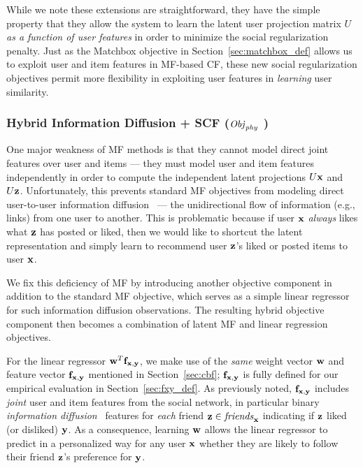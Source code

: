 While we note these extensions are straightforward, they have the
simple property that they allow the system to learn the latent user
projection matrix $U$ \emph{as a function of user features} in order
to minimize the social regularization penalty.  Just as the Matchbox
objective in Section~\ref{sec:matchbox_def} allows us to exploit user
and item features in MF-based CF, these new social regularization
objectives permit more flexibility in exploiting user features in
\emph{learning} user similarity.


\subsubsection{Hybrid Information Diffusion + SCF ($\mathit{Obj}_{\mathit{phy}}$ )}

\label{sec:hybrid_scf}

One major weakness of MF methods is that they cannot model direct
joint features over user and items --- they must model user and item
features independently in order to compute the independent latent
projections $U\mathbf{x}$ and $U\mathbf{z}$.  Unfortunately, this prevents standard MF
objectives from modeling direct user-to-user information
diffusion~\cite{inf_diffusion} --- the unidirectional flow of
information (e.g., links) from one user to another.  This is
problematic because if user $\mathbf{x}$ \emph{always} likes what $\mathbf{z}$ has
posted or liked, then we would like to shortcut the latent
representation and simply learn to recommend user $\mathbf{z}$'s liked or 
posted items to user $\mathbf{x}$.

We fix this deficiency of MF by introducing another objective component
in addition to the standard MF objective, which serves as
a simple linear regressor for such information diffusion
observations.  The resulting hybrid objective component then becomes a
combination of latent MF and linear regression objectives.

For the linear regressor $\mathbf{w}^T \mathbf{f}_{\mathbf{x},\mathbf{y}}$, we make use of the
\emph{same} weight vector $\mathbf{w}$ and feature vector $\mathbf{f}_{\mathbf{x},\mathbf{y}}$
mentioned in Section~\ref{sec:cbf}; $\mathbf{f}_{\mathbf{x},\mathbf{y}}$ is fully defined for
our empirical evaluation in Section~\ref{sec:fxy_def}.  As previously
noted, $\mathbf{f}_{\mathbf{x},\mathbf{y}}$ includes
\emph{joint} user and item features from the social network, in
particular binary
\emph{information diffusion}~\cite{inf_diffusion} features
for \emph{each} friend $\mathbf{z} \in \mathit{friends}_{\mathbf{x}}$ indicating if $\mathbf{z}$
liked (or disliked) $\mathbf{y}$.  As a consequence, learning $\mathbf{w}$ allows the
linear regressor to predict in a personalized way for any user $\mathbf{x}$
whether they are likely to follow their friend $\mathbf{z}$'s preference for $\mathbf{y}$.


